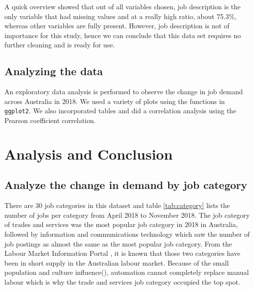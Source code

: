 \documentclass[11pt,a4paper,]{article}
\begin{document}
A quick overview showed that out of all variables chosen, job description is the only variable that had missing values and at a really high ratio, about 75.3\%, whereas other variables are fully present. However, job description is not of importance for this study, hence we can conclude that this data set requires no further cleaning and is ready for use.

\hypertarget{analyzing-the-data}{%
\subsection{Analyzing the data}\label{analyzing-the-data}}

An exploratory data analysis is performed to observe the change in job demand across Australia in 2018. We used a variety of plots using the functions in \texttt{ggplot2}. We also incorporated tables and did a correlation analysis using the Pearson coefficient correlation.

\hypertarget{analysis-and-conclusion}{%
\section{Analysis and Conclusion}\label{analysis-and-conclusion}}

\hypertarget{analyze-the-change-in-demand-by-job-category}{%
\subsection{Analyze the change in demand by job category}\label{analyze-the-change-in-demand-by-job-category}}

There are 30 job categories in this dataset and table \ref{tab:category} lists the number of jobs per category from April 2018 to November 2018. The job category of trades and services was the most popular job category in 2018 in Australia, followed by information and communications technology which saw the number of job postings as almost the same as the most popular job category. From the Labour Market Information Portal \autocite{welcome}, it is known that those two categories have been in short supply in the Australian labour market. Because of the small population and culture influence(\textcite{burgess_2018}), automation cannot completely replace manual labour which is why the trade and services job category occupied the top spot.
\end{document}
